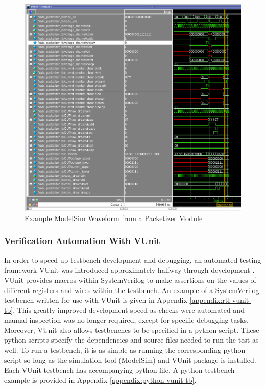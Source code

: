 \documentclass[letterpaper,11pt]{article}
\begin{document}
\begin{figure}[H]
  \centering
  \includegraphics[width=\textwidth]{figures/modelsim-packetizer.png}
  \caption{Example ModelSim Waveform from a Packetizer Module}
  \label{fig:xadc-packetizer-modelsim}
\end{figure}

\subsubsection{Verification Automation With VUnit}
In order to speed up testbench development and debugging, an automated testing
framework VUnit was introduced approximately halfway through development
\cite{vunit}. VUnit provides macros within SystemVerilog to make assertions on
the values of different registers and wires within the testbench. An example of
a SystemVerilog testbench written for use with VUnit is given in Appendix
\ref{appendix:rtl-vunit-tb}. This greatly improved development speed as checks
were automated and manual inspection was no longer required, except for specific
debugging tasks. Moreover, VUnit also allows testbenches to be specified in a
python script. These python scripts specify the dependencies and source files
needed to run the test as well. To run a testbench, it is as simple as running
the corresponding python script so long as the simulation tool (ModelSim) and
VUnit package is installed. Each VUnit testbench has accompanying python file. A
python testbench example is provided in Appendix \ref{appendix:python-vunit-tb}.
\end{document}
